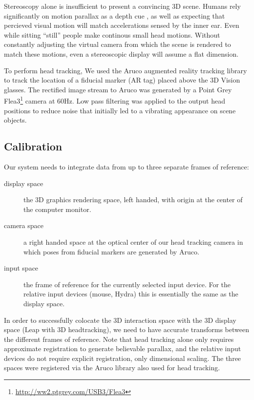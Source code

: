Stereoscopy alone is insufficient to present a convincing 3D scene.  Humans
rely significantly on motion parallax as a depth cue \cite{parallax}, as well
as expecting that percieved visual motion will match accelerations sensed by
the inner ear.  Even while sitting ``still'' people make continous small head
motions.  Without constantly adjusting the virtual camera from which the scene
is rendered to match these motions, even a stereoscopic display will assume a
flat dimension.

To perform head tracking, We used the Aruco augmented reality tracking library
\cite{aruco} to track the location of a fiducial marker (AR tag) placed above
the 3D Vision glasses.  The rectified image stream to Aruco was generated by a
Point Grey Flea3\footnote{\url{http://ww2.ptgrey.com/USB3/Flea3}} camera at
60Hz.  Low pass filtering was applied to the output head positions to reduce
noise that initially led to a vibrating appearance on scene objects.

\subsection{Calibration}

Our system needs to integrate data from up to three separate frames of
reference:

\begin{description}

\item[display space] the 3D graphics rendering space, left handed, with origin
  at the center of the computer monitor.

\item[camera space] a right handed space at the optical center of our head
  tracking camera in which poses from fiducial markers are generated by Aruco.

\item[input space] the frame of reference for the currently selected input
  device.  For the relative input devices (mouse, Hydra) this is essentially
  the same as the display space.

\end{description}

In order to successfully colocate the 3D interaction space with the 3D display
space (Leap with 3D headtracking), we need to have accurate transforms between
the different frames of reference.  Note that head tracking alone only
requires approximate registration to generate believable parallax, and the
relative input devices do not require explicit registration, only dimensional
scaling. The three spaces were registered via the Aruco library also used for
head tracking.

